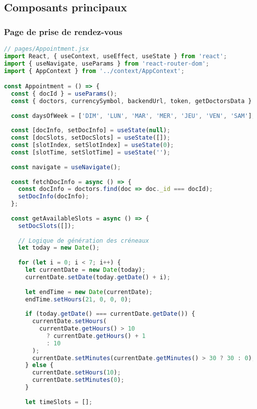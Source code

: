 \subsection{Composants principaux}

\subsubsection{Page de prise de rendez-vous}

\begin{lstlisting}[language=JavaScript, caption=Composant de réservation]
// pages/Appointment.jsx
import React, { useContext, useEffect, useState } from 'react';
import { useNavigate, useParams } from 'react-router-dom';
import { AppContext } from '../context/AppContext';

const Appointment = () => {
  const { docId } = useParams();
  const { doctors, currencySymbol, backendUrl, token, getDoctorsData } = useContext(AppContext);
  
  const daysOfWeek = ['DIM', 'LUN', 'MAR', 'MER', 'JEU', 'VEN', 'SAM'];
  
  const [docInfo, setDocInfo] = useState(null);
  const [docSlots, setDocSlots] = useState([]);
  const [slotIndex, setSlotIndex] = useState(0);
  const [slotTime, setSlotTime] = useState('');
  
  const navigate = useNavigate();
  
  const fetchDocInfo = async () => {
    const docInfo = doctors.find(doc => doc._id === docId);
    setDocInfo(docInfo);
  };
  
  const getAvailableSlots = async () => {
    setDocSlots([]);
    
    // Logique de génération des créneaux
    let today = new Date();
    
    for (let i = 0; i < 7; i++) {
      let currentDate = new Date(today);
      currentDate.setDate(today.getDate() + i);
      
      let endTime = new Date(currentDate);
      endTime.setHours(21, 0, 0, 0);
      
      if (today.getDate() === currentDate.getDate()) {
        currentDate.setHours(
          currentDate.getHours() > 10 
            ? currentDate.getHours() + 1 
            : 10
        );
        currentDate.setMinutes(currentDate.getMinutes() > 30 ? 30 : 0);
      } else {
        currentDate.setHours(10);
        currentDate.setMinutes(0);
      }
      
      let timeSlots = [];
      

\end{lstlisting}
